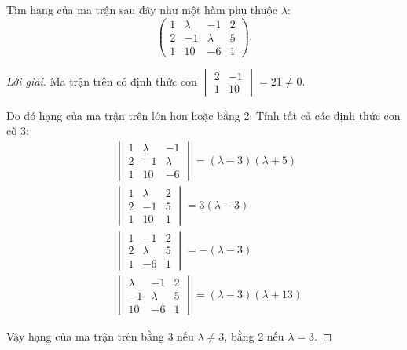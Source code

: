 \begin{exercise}
    Tìm hạng của ma trận sau đây như một hàm phụ thuộc $\lambda$:
    \[
        \begin{pmatrix}
            1 & \lambda & -1      & 2 \\
            2 & -1      & \lambda & 5 \\
            1 & 10      & -6      & 1
        \end{pmatrix}.
    \]
\end{exercise}

\begin{proof}[Lời giải]
    Ma trận trên có định thức con $\begin{vmatrix}2 & -1 \\ 1 & 10\end{vmatrix} = 21 \ne 0$.
    
    Do đó hạng của ma trận trên lớn hơn hoặc bằng 2. Tính tất cả các định thức con cỡ 3:
    \begin{align*}
         & \begin{vmatrix}
               1 & \lambda & -1      \\
               2 & -1      & \lambda \\
               1 & 10      & -6
           \end{vmatrix} = (\lambda - 3)(\lambda + 5)  \\
         & \begin{vmatrix}
               1 & \lambda & 2 \\
               2 & -1      & 5 \\
               1 & 10      & 1
           \end{vmatrix} = 3(\lambda - 3)              \\
         & \begin{vmatrix}
               1 & -1      & 2 \\
               2 & \lambda & 5 \\
               1 & -6      & 1
           \end{vmatrix} = -(\lambda - 3)              \\
         & \begin{vmatrix}
               \lambda & -1      & 2 \\
               -1      & \lambda & 5 \\
               10      & -6      & 1
           \end{vmatrix} = (\lambda - 3)(\lambda + 13)
    \end{align*}
    
    Vậy hạng của ma trận trên bằng 3 nếu $\lambda \ne 3$, bằng 2 nếu $\lambda = 3$.
\end{proof}

